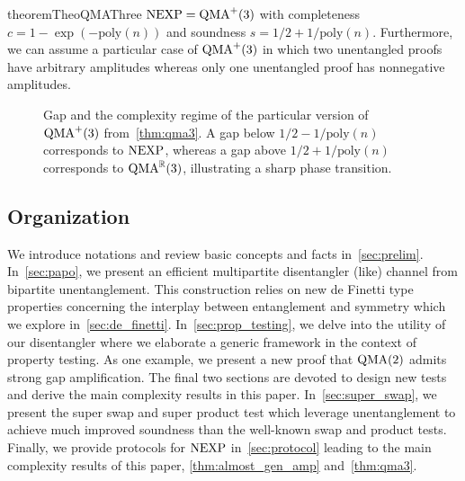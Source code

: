 \documentclass[10pt,a4paper]{article}
\theoremstyle{remark}
\newcommand{\R}{{\mathbb R}}
\newcommand{\poly}{{\mathrm{poly}}}
\newcommand{\1}[1]{\mathds{1}{[#1]}}
\newcommand{\QMA}{\textup{QMA}}
\newcommand{\NEXP}{\textup{NEXP}}
\numberwithin{equation}{section}
\begin{document}
\begin{restatable}{theorem}{TheoQMAThree}\label{thm:qma3}
  $\NEXP = \textup{QMA}^+(3)$ with completeness $c=1-\exp(-\poly(n))$
  and soundness $s=1/2+1/\poly(n)$. Furthermore, we can assume a
  particular case of $\textup{QMA}^+(3)$ in which two unentangled
  proofs have arbitrary amplitudes whereas only one unentangled proof has
  nonnegative amplitudes.
\end{restatable}


\begin{figure}[ht]
  \captionsetup{width=.8\linewidth}
  \centering
{}
\caption{Gap and the complexity regime of the particular version of $\QMA^+(3)$ from~\cref{thm:qma3}.
         A gap below $1/2-1/\poly(n)$ corresponds to $\NEXP$, whereas a gap above $1/2+1/\poly(n)$
         corresponds to $\QMA^\R(3)$, illustrating a sharp phase transition.}
\end{figure}


\subsection{Organization}

We introduce notations and review basic concepts and facts in~\cref{sec:prelim}.
%
In~\cref{sec:papo}, we present an efficient multipartite disentangler (like) channel from bipartite unentanglement.
%
This construction relies on new de Finetti type properties concerning the interplay between entanglement and symmetry
which we explore in~\cref{sec:de_finetti}.
%
In~\cref{sec:prop_testing}, we delve into the utility of our disentangler where we elaborate a generic framework in the context of property testing. As one example, we present a new proof that $\QMA(2)$ admits strong gap amplification.
%
The final two sections are devoted to design new tests and derive the main complexity results in this paper.
In~\cref{sec:super_swap}, we present the super swap and super product test which leverage
unentanglement to achieve much improved soundness than the well-known swap and product tests.
%
Finally, we provide protocols for $\NEXP$ in~\cref{sec:protocol} leading to the main complexity results of this paper,
\cref{thm:almost_gen_amp} and~\cref{thm:qma3}.
\end{document}
